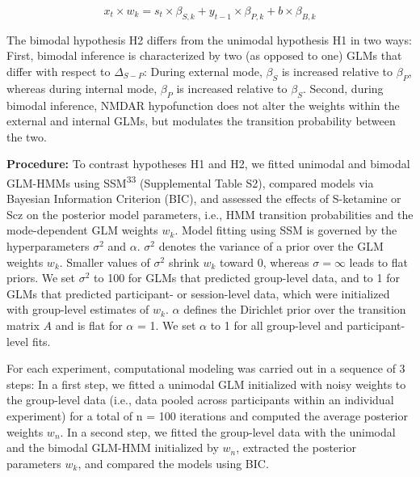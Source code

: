 \documentclass[
]{article}
\begin{document}
\begin{equation}
x_t \times w_k =  s_t \times \beta_{S,k} + y_{t-1} \times \beta_{P,k}  + b \times \beta_{B,k}  
\end{equation}

The bimodal hypothesis H2 differs from the unimodal hypothesis H1 in two
ways: First, bimodal inference is characterized by two (as opposed to
one) GLMs that differ with respect to \(\Delta_{S-P}\): During external
mode, \(\beta_S\) is increased relative to \(\beta_P\), whereas during
internal mode, \(\beta_P\) is increased relative to \(\beta_S\). Second,
during bimodal inference, NMDAR hypofunction does not alter the weights
within the external and internal GLMs, but modulates the transition
probability between the two.

\textbf{Procedure:} To contrast hypotheses H1 and H2, we fitted unimodal
and bimodal GLM-HMMs using SSM\textsuperscript{33} (Supplemental Table
S2), compared models via Bayesian Information Criterion (BIC), and
assessed the effects of S-ketamine or Scz on the posterior model
parameters, i.e., HMM transition probabilities and the mode-dependent
GLM weights \(w_k\). Model fitting using SSM is governed by the
hyperparameters \(\sigma^2\) and \(\alpha\). \(\sigma^2\) denotes the
variance of a prior over the GLM weights \(w_k\). Smaller values of
\(\sigma^2\) shrink \(w_k\) toward 0, whereas \(\sigma = \infty\) leads
to flat priors. We set \(\sigma^2\) to 100 for GLMs that predicted
group-level data, and to 1 for GLMs that predicted participant- or
session-level data, which were initialized with group-level estimates of
\(w_k\). \(\alpha\) defines the Dirichlet prior over the transition
matrix \(A\) and is flat for \(\alpha\) = 1. We set \(\alpha\) to 1 for
all group-level and participant-level fits.

For each experiment, computational modeling was carried out in a
sequence of 3 steps: In a first step, we fitted a unimodal GLM
initialized with noisy weights to the group-level data (i.e., data
pooled across participants within an individual experiment) for a total
of n = 100 iterations and computed the average posterior weights
\(w_n\). In a second step, we fitted the group-level data with the
unimodal and the bimodal GLM-HMM initialized by \(w_n\), extracted the
posterior parameters \(w_k\), and compared the models using BIC.
\end{document}
